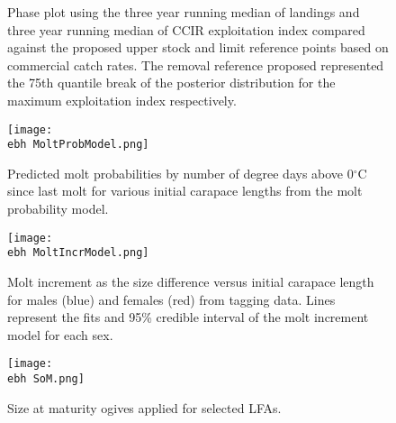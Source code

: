 \documentclass[11pt]{article}
\newcommand{\e}{/backup/bio_data/bio.lobster/figures/} %
\newcommand{\ebh}{/backup/bio_data/bio.lobster/figures/LFA2733Framework2018/} %
\begin{document}
\begin{figure}
        \centering
                    \caption{Phase plot using the three year running median of landings and three year running median of CCIR exploitation index compared against the proposed upper stock and limit reference points based on commercial catch rates. The removal reference proposed represented the 75th quantile break of the posterior distribution for the maximum exploitation index respectively.}
        \end{figure}




    \begin{figure}
    \centering
        \texttt{[image: \\ebh MoltProbModel.png]}
        \caption{Predicted molt probabilities by number of degree days above 0$^{\circ}$C since last molt for various initial carapace lengths from the molt probability model.}

    \end{figure}

    \begin{figure}
    \centering
        \texttt{[image: \\ebh MoltIncrModel.png]}
        \caption{Molt increment as the size difference versus initial carapace length for males (blue) and females (red) from tagging data. Lines represent the fits and 95\% credible interval of the molt increment model for each sex.}

    \end{figure}    

  
    \begin{figure}
    \centering
        \texttt{[image: \\ebh SoM.png]}
        \caption{Size at maturity ogives applied for selected LFAs.}

    \end{figure}    

  



    
\end{document}
